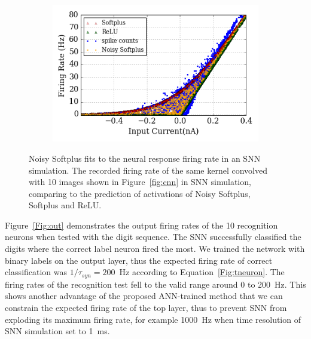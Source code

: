 			
	\begin{figure}[tbh!]
		\centering
		\begin{subfigure}[t]{0.8\textwidth}
			\includegraphics[width=\textwidth]{pics_iconip/6-5.png}
		\end{subfigure}
		\caption{
			Noisy Softplus fits to the neural response firing rate in an SNN simulation.
			The recorded firing rate of the same kernel convolved with 10 images shown in Figure~\ref{fig:cnn} in SNN simulation, comparing to the prediction of activations of Noisy Softplus, Softplus and ReLU.}
		\label{fig:af_compare}
	\end{figure}
	
	Figure~\ref{Fig:out} demonstrates the output firing rates of the 10 recognition neurons when tested with the digit sequence.
	The SNN successfully classified the digits where the correct label neuron fired the most.
	We trained the network with binary labels on the output layer, thus the expected firing rate of correct classification was $1/\tau_{syn}=200$~Hz according to Equation~\ref{Fig:tneuron}.
	The firing rates of the recognition test fell to the valid range around 0 to 200~Hz.
	This shows another advantage of the proposed ANN-trained method that we can constrain the expected firing rate of the top layer, thus to prevent SNN from exploding its maximum firing rate, for example 1000~Hz when time resolution of SNN simulation set to 1~ms.
	
